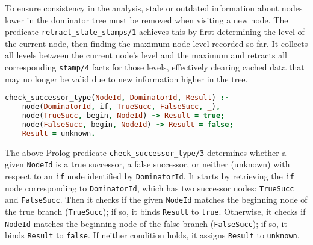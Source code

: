 \smallbreak
To ensure consistency in the analysis, stale or outdated information about nodes lower in the dominator tree must be removed when visiting a new node. The predicate \texttt{retract\_stale\_stamps/1} achieves this by first determining the level of the current node, then finding the maximum node level recorded so far. It collects all levels between the current node’s level and the maximum and retracts all corresponding \texttt{stamp/4} facts for those levels, effectively clearing cached data that may no longer be valid due to new information higher in the tree.

\smallbreak

\begin{lstlisting}[language=Prolog]
% Predicate to check if a node is a true successor or a false successor of a given node
check_successor_type(NodeId, DominatorId, Result) :-
    node(DominatorId, if, TrueSucc, FalseSucc, _),
    node(TrueSucc, begin, NodeId) -> Result = true;
    node(FalseSucc, begin, NodeId) -> Result = false;
    Result = unknown.
\end{lstlisting}

\newpage
The above Prolog predicate \texttt{check\_successor\_type/3} determines whether a given \texttt{NodeId} is a true successor, a false successor, or neither (unknown) with respect to an \texttt{if} node identified by \texttt{DominatorId}. It starts by retrieving the \texttt{if} node corresponding to \texttt{DominatorId}, which has two successor nodes: \texttt{TrueSucc} and \texttt{FalseSucc}. Then it checks if the given \texttt{NodeId} matches the beginning node of the true branch (\texttt{TrueSucc}); if so, it binds \texttt{Result} to \texttt{true}. Otherwise, it checks if \texttt{NodeId} matches the beginning node of the false branch (\texttt{FalseSucc}); if so, it binds \texttt{Result} to \texttt{false}. If neither condition holds, it assigns \texttt{Result} to \texttt{unknown}.

